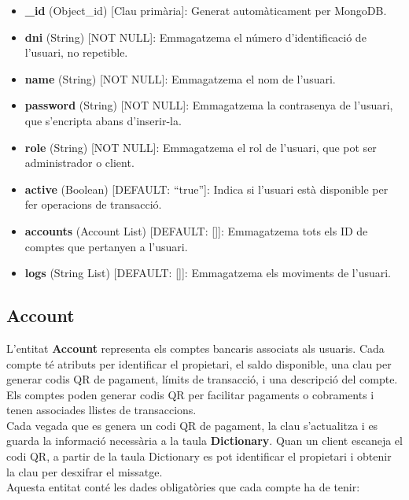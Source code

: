 \documentclass[a4paper,12pt,twoside]{ThesisStyle}
\begin{document}
\begin{itemize}
    \item \textbf{\_id} (Object\_id) [Clau primària]: Generat automàticament per MongoDB.
    \item \textbf{dni} (String) [NOT NULL]: Emmagatzema el número d'identificació de l'usuari, no repetible.
    \item \textbf{name} (String) [NOT NULL]: Emmagatzema el nom de l'usuari.
    \item \textbf{password} (String) [NOT NULL]: Emmagatzema la contrasenya de l'usuari, que s'encripta abans d'inserir-la.
    \item \textbf{role} (String) [NOT NULL]: Emmagatzema el rol de l'usuari, que pot ser administrador o client.
    \item \textbf{active} (Boolean) [DEFAULT: ``true'']: Indica si l'usuari està disponible per fer operacions de transacció.
    \item \textbf{accounts} (Account List) [DEFAULT: []]: Emmagatzema tots els ID de comptes que pertanyen a l'usuari.
    \item \textbf{logs} (String List) [DEFAULT: []]: Emmagatzema els moviments de l'usuari.
\end{itemize}


\subsection{Account}
\label{subsec: Account}


L'entitat \textbf{Account} representa els comptes bancaris associats als usuaris. Cada compte té atributs per identificar el propietari, el saldo disponible, una clau per generar codis QR de pagament, límits de transacció, i una descripció del compte. Els comptes poden generar codis QR per facilitar pagaments o cobraments i tenen associades llistes de transaccions.\\

Cada vegada que es genera un codi QR de pagament, la clau s'actualitza i es guarda la informació necessària a la taula \textbf{Dictionary}. Quan un client escaneja el codi QR, a partir de la taula Dictionary es pot identificar el propietari i obtenir la clau per desxifrar el missatge.\\

Aquesta entitat conté les dades obligatòries que cada compte ha de tenir:
\end{document}
